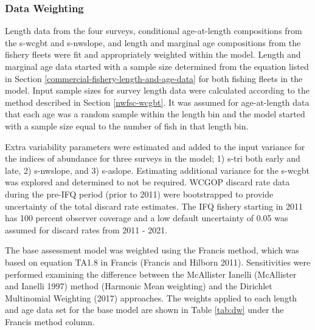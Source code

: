 \documentclass[11pt,
  english,
  a4paper,
]{article}
\begin{document}

\hypertarget{data-weighting}{%
\subsubsection{Data Weighting}\label{data-weighting}}

\leavevmode\tagmcend\tagstructend


Length data from the four surveys, conditional age-at-length compositions from the \gls{s-wcgbt} and \gls{s-nwslope}, and length and marginal age compositions from the fishery fleets were fit and appropriately weighted within the model. Length and marginal age data started with a sample size determined from the equation listed in Section \ref{commercial-fishery-length-and-age-data} for both fishing fleets in the model. Input sample sizes for survey length data were calculated according to the method described in Section \ref{nwfsc-wcgbt}. It was assumed for age-at-length data that each age was a random sample within the length bin and the model started with a sample size equal to the number of fish in that length bin.

\leavevmode\tagmcend\tagstructend\par


Extra variability parameters were estimated and added to the input variance for the indices of abundance for three surveys in the model; 1) \gls{s-tri} both early and late, 2) \gls{s-nwslope}, and 3) \gls{s-aslope}. Estimating additional variance for the \gls{s-wcgbt} was explored and determined to not be required. WCGOP discard rate data during the pre-IFQ period (prior to 2011) were bootstrapped to provide uncertainty of the total discard rate estimates. The IFQ fishery starting in 2011 has 100 percent observer coverage and a low default uncertainty of 0.05 was assumed for discard rates from 2011 - 2021.

\leavevmode\tagmcend\tagstructend\par


The base assessment model was weighted using the Francis method, which was based on equation TA1.8 in Francis {(Francis and Hilborn 2011)\leavevmode\tagmcend\tagstructend}. Sensitivities were performed examining the difference between the McAllister Ianelli {(McAllister and Ianelli 1997)\leavevmode\tagmcend\tagstructend} method (Harmonic Mean weighting) and the Dirichlet Multinomial Weighting {(2017)\leavevmode\tagmcend\tagstructend} approaches. The weights applied to each length and age data set for the base model are shown in Table \ref{tab:dw} under the Francis method column.
\end{document}
